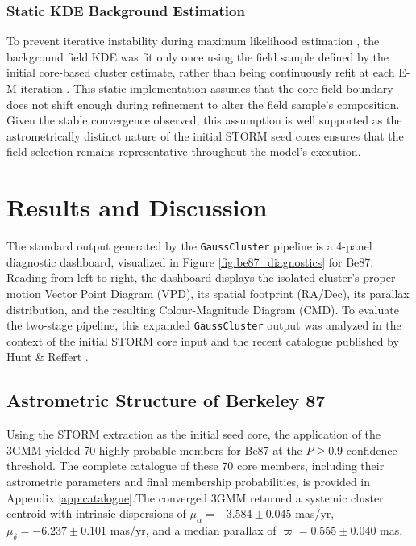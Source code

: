 \documentclass{CU_IOPStyle_PXT999}
\begin{document}
\subsubsection{Static KDE Background Estimation} 
\label{ssec:3.2.3} 
To prevent iterative instability during maximum likelihood estimation \cite{zhao_1990}, the background field KDE was fit only once using the field sample defined by the initial core-based cluster estimate, rather than being continuously refit at each E-M iteration \cite{cabrera-cano_1990, dias_2014}. This static implementation assumes that the core-field boundary does not shift enough during refinement to alter the field sample's composition. Given the stable convergence observed, this assumption is well supported as the astrometrically distinct nature of the initial STORM seed cores ensures that the field selection remains representative throughout the model's execution.

\section{Results and Discussion}
\label{ssec:4}

The standard output generated by the \texttt{GaussCluster} pipeline is a 4-panel diagnostic dashboard, visualized in Figure \ref{fig:be87_diagnostics} for Be87. Reading from left to right, the dashboard displays the isolated cluster's proper motion Vector Point Diagram (VPD), its spatial footprint (RA/Dec), its parallax distribution, and the resulting Colour-Magnitude Diagram (CMD). To evaluate the two-stage pipeline, this expanded \texttt{GaussCluster} output was analyzed in the context of the initial STORM core input and the recent catalogue published by Hunt \& Reffert \cite{hunt_improving_2023}.

\subsection{Astrometric Structure of Berkeley 87}
\label{ssec:4.1}

Using the STORM extraction as the initial seed core, the application of the 3GMM yielded 70 highly probable members for Be87 at the $P \ge 0.9$ confidence threshold. The complete catalogue of these 70 core members, including their astrometric parameters and final membership probabilities, is provided in Appendix \ref{app:catalogue}.The converged 3GMM returned a systemic cluster centroid with intrinsic dispersions of $\mu_{\alpha} = -3.584 \pm 0.045$ mas/yr, $\mu_{\delta} = -6.237 \pm 0.101$ mas/yr, and a median parallax of $\varpi = 0.555 \pm 0.040$ mas.
\end{document}
